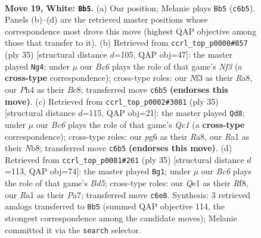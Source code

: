 \documentclass[11pt]{article}
\begin{document}
\clearpage

\begin{figure}[p]\centering
\begin{subfigure}{0.46\textwidth}\centering
\resizebox{\linewidth}{!}{%
\newchessgame
\chessboard[
  setfen={2b2rk1/2p2p2/r1B3p1/p3p2p/2P3nP/3q1N2/PP1N2P1/R1B1Q2K w - - 1 19},
  showmover=false,
  pgfstyle=straightmove, color=movearrow, markmove={c6-b5}
]}
\caption{}
\end{subfigure}\hfill
\begin{subfigure}{0.46\textwidth}\centering
\resizebox{\linewidth}{!}{%
\newchessgame
\chessboard[
  setfen={r1bqk1r1/1pp2p2/3p1n1Q/p7/4n3/P2B1N2/1P3PPP/R1B1K2R b KQq - 8 18},
  showmover=false,
  pgfstyle=straightmove, color=movearrow, markmove={f6-g4}
]}
\caption{}
\end{subfigure}
\\[4pt]
\begin{subfigure}{0.46\textwidth}\centering
\resizebox{\linewidth}{!}{%
\newchessgame
\chessboard[
  setfen={rnq3k1/5ppp/4pn2/p2b4/3P4/N3PN1P/4BPP1/1QR3K1 b - - 3 18},
  showmover=false,
  pgfstyle=straightmove, color=movearrow, markmove={c8-d8}
]}
\caption{}
\end{subfigure}\hfill
\begin{subfigure}{0.46\textwidth}\centering
\resizebox{\linewidth}{!}{%
\newchessgame
\chessboard[
  setfen={5rk1/ppp1q1p1/4b1Qp/5n2/3bN3/2PP4/PP2B1PP/R1B1K3 b Q - 0 18},
  showmover=false,
  pgfstyle=straightmove, color=movearrow, markmove={d4-g1}
]}
\caption{}
\end{subfigure}
\caption{\textbf{Move 19, White: \texttt{Bb5}.} (a) Our position; Melanie plays \texttt{Bb5} (\texttt{c6b5}). Panels (b)--(d) are the retrieved master positions whose correspondence most drove this move (highest QAP objective among those that transfer to it). (b) Retrieved from \texttt{ccrl\_top\_p0000\#857} (ply 35) [structural distance $d$=105, QAP obj=47]: the master played \texttt{Ng4}; under $\mu$ our \emph{Bc6} plays the role of that game's \emph{Nf3} (a \textbf{cross-type} correspondence); cross-type roles: our \emph{N}f3 as their \emph{R}a8, our \emph{P}h4 as their \emph{B}c8; transferred move \texttt{c6b5} \textbf{(endorses this move)}. (c) Retrieved from \texttt{ccrl\_top\_p0002\#3081} (ply 35) [structural distance $d$=115, QAP obj=21]: the master played \texttt{Qd8}; under $\mu$ our \emph{Bc6} plays the role of that game's \emph{Qc1} (a \textbf{cross-type} correspondence); cross-type roles: our \emph{p}g6 as their \emph{R}a8, our \emph{R}a1 as their \emph{N}b8; transferred move \texttt{c6b5} \textbf{(endorses this move)}. (d) Retrieved from \texttt{ccrl\_top\_p0001\#261} (ply 35) [structural distance $d$=113, QAP obj=74]: the master played \texttt{Bg1}; under $\mu$ our \emph{Bc6} plays the role of that game's \emph{Bd5}; cross-type roles: our \emph{Q}e1 as their \emph{R}f8, our \emph{R}a1 as their \emph{P}a7; transferred move \texttt{c6e8}. Synthesis: 3 retrieved analogs transferred to \texttt{Bb5} (summed QAP objective 114, the strongest correspondence among the candidate moves); Melanie committed it via the \texttt{search} selector.}
\label{fig:thought-m36}
\end{figure}
\end{document}
